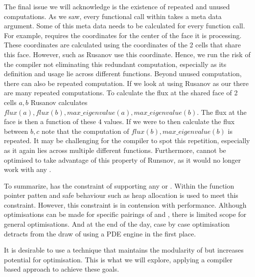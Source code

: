 The final issue we will acknowledge is the existence of repeated and unused computations.
As we saw, every functional call within  takes a meta data argument.
Some of this meta data needs to be calculated for every function call.
For example,  requires the coordinates for the center of the face it is processing.
These coordinates are calculated using the coordinates of the 2 cells that share this face.
However,  such as Rusanov use this coordinate.
Hence, we run the risk of the compiler not eliminating this redundant computation, especially as its definition and usage lie across different functions. 
Beyond unused computation, there can also be repeated computation.
If we look at using Rusanov as our  there are many repeated computations.
To calculate the flux at the shared face of 2 cells $a,b$ Rusanov calculates $flux(a), flux(b), max\_eigenvalue(a), max\_eigenvalue(b)$.
The flux at the face is then a function of these 4 values.
If we were to then calculate the flux between $b,c$ note that the computation of $flux(b), max\_eigenvalue(b)$ is repeated.
It may be challenging for the compiler to spot this repetition, especially as it again lies across multiple different functions.
Furthermore,  cannot be optimised to take advantage of this property of Runsnov, as it would no longer work with any .

To summarize,  has the constraint of supporting any  or . 
Within  the function pointer patten and safe behaviour such as heap allocation is used to meet this constraint.
However, this constraint is in contension with performance.
Although optimisations can be made for specific pairings of  and , there is limited scope for general optimisations. 
And at the end of the day, case by case optimisation detracts from the draw of using a PDE engine in the first place.

It is desirable to use a technique that maintains the modularity of  but increases potential for optimisation.
This is what we will explore, applying a compiler based approach to achieve these goals.

